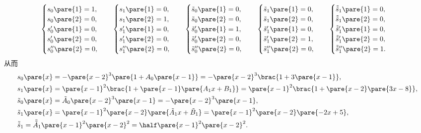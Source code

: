 \documentclass[hidelinks]{ctexart}
\begin{document}
\[ \begin{cases}
    s_0\pare{1} = 1, \\
    s_0\pare{2} = 0, \\
    s'_0\pare{1} = 0, \\
    s'_0\pare{2} = 0, \\
    s''_0\pare{2} = 0,
\end{cases}\quad \begin{cases}
    s_1\pare{1} = 0, \\
    s_1\pare{2} = 1, \\
    s'_1\pare{1} = 0, \\
    s'_1\pare{2} = 0, \\
    s''_1\pare{2} = 0,
\end{cases}\quad \begin{cases}
    \tilde{s}_0\pare{1} = 0, \\
    \tilde{s}_0\pare{2} = 0, \\
    \tilde{s}'_0\pare{1} = 1, \\
    \tilde{s}'_0\pare{2} = 0, \\
    \tilde{s}''_0\pare{2} = 0,
\end{cases}\quad \begin{cases}
    \tilde{s}_1\pare{1} = 0, \\
    \tilde{s}_1\pare{2} = 0, \\
    \tilde{s}'_1\pare{1} = 0, \\
    \tilde{s}'_1\pare{2} = 1, \\
    \tilde{s}''_1\pare{2} = 0,
\end{cases}\quad \begin{cases}
    \tilde{\tilde{s}}_1\pare{1} = 0, \\
    \tilde{\tilde{s}}_1\pare{2} = 0, \\
    \tilde{\tilde{s}}'_1\pare{1} = 0, \\
    \tilde{\tilde{s}}'_1\pare{2} = 0, \\
    \tilde{\tilde{s}}''_1\pare{2} = 1.
\end{cases} \]
从而
\begin{align*}
    & s_0\pare{x} = -\pare{x-2}^3\pare{1+A_0\pare{x-1}} = -\pare{x-2}^3\brac{1+3\pare{x-1}}, \\
    & s_1\pare{x} = \pare{x-1}^2\brac{1+\pare{x-1}\pare{A_1x+B_1}} = \pare{x-1}^2\brac{1+\pare{x-2}\pare{3x - 8}}, \\
    & \tilde{s}_0\pare{x} = \tilde{A}_0\pare{x-2}^3\pare{x-1} = -\pare{x-2}^3\pare{x-1}, \\
    & \tilde{s}_1\pare{x} = \pare{x-1}^2\pare{x-2}\pare{\tilde{A}_1 x + \tilde{B}_1} = \pare{x-1}^2\pare{x-2}\pare{-2 x + 5}, \\
    & \tilde{\tilde{s}}_1 = \tilde{\tilde{A}}_1 \pare{x-1}^2\pare{x-2}^2 = \half \pare{x-1}^2\pare{x-2}^2.
\end{align*}
\end{document}
